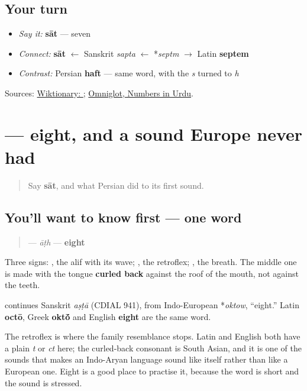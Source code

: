 \subsection*{Your turn}
\begin{itemize}
\raggedright
  \item \emph{Say it:} \textbf{sāt} — seven
  \item \emph{Connect:} \textbf{sāt} $\leftarrow$ Sanskrit \emph{sapta} $\leftarrow$ *\emph{septm} $\to$ Latin \textbf{septem}
  \item \emph{Contrast:} Persian \textbf{haft} — same word, with the \emph{s} turned to \emph{h}
\end{itemize}

\begin{tcolorbox}[breakable,colback=teal!4,colframe=teal!35!black,title={Before you move on}]
Sources: \href{https://en.wiktionary.org/wiki/\%D8\%B3\%D8\%A7\%D8\%AA}{Wiktionary: }; \href{https://www.omniglot.com/language/numbers/urdu.htm}{Omniglot, Numbers in Urdu}.
\end{tcolorbox}
\section[\texorpdfstring{\ur{آٹھ} (āṭh)}{آٹھ (āṭh)}]{ — eight, and a sound Europe never had}

\label{lesson:UR-C29-aath}



\begin{quote}
Say \textbf{sāt}, and what Persian did to its first sound.
\end{quote}

\subsection*{You'll want to know first — one word}
\begin{quote}
\textbf{} — \emph{āṭh} — \textbf{eight}
\end{quote}

Three signs: \textbf{}, the alif with its wave; \textbf{}, the retroflex; \textbf{}, the breath. The middle one is made with the tongue \textbf{curled back} against the roof of the mouth, not against the teeth.

\begin{cousinweb}
\textbf{} continues Sanskrit \emph{aṣṭā} (CDIAL 941), from Indo-European *\emph{oktow}, \textquotedblleft{}eight.\textquotedblright{} Latin \textbf{octō}, Greek \textbf{okt\'{\={o}}} and English \textbf{eight} are the same word.

The retroflex is where the family resemblance stops. Latin and English both have a plain \emph{t} or \emph{ct} here; the curled-back consonant is South Asian, and it is one of the sounds that makes an Indo-Aryan language sound like itself rather than like a European one. Eight is a good place to practise it, because the word is short and the sound is stressed.
\end{cousinweb}

